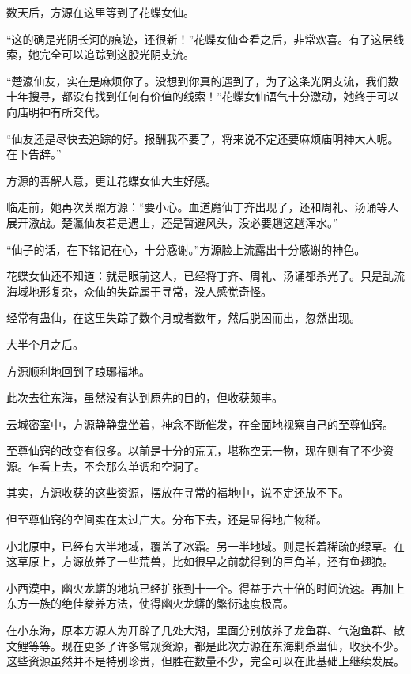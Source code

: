 
\begin{this_body}



数天后，方源在这里等到了花蝶女仙。

“这的确是光阴长河的痕迹，还很新！”花蝶女仙查看之后，非常欢喜。有了这层线索，她完全可以追踪到这股光阴支流。

“楚瀛仙友，实在是麻烦你了。没想到你真的遇到了，为了这条光阴支流，我们数十年搜寻，都没有找到任何有价值的线索！”花蝶女仙语气十分激动，她终于可以向庙明神有所交代。

“仙友还是尽快去追踪的好。报酬我不要了，将来说不定还要麻烦庙明神大人呢。在下告辞。”

方源的善解人意，更让花蝶女仙大生好感。

临走前，她再次关照方源：“要小心。血道魔仙丁齐出现了，还和周礼、汤诵等人展开激战。楚瀛仙友若是遇上，还是暂避风头，没必要趟这趟浑水。”

“仙子的话，在下铭记在心，十分感谢。”方源脸上流露出十分感谢的神色。

花蝶女仙还不知道：就是眼前这人，已经将丁齐、周礼、汤诵都杀光了。只是乱流海域地形复杂，众仙的失踪属于寻常，没人感觉奇怪。

经常有蛊仙，在这里失踪了数个月或者数年，然后脱困而出，忽然出现。

大半个月之后。

方源顺利地回到了琅琊福地。

此次去往东海，虽然没有达到原先的目的，但收获颇丰。

云城密室中，方源静静盘坐着，神念不断催发，在全面地视察自己的至尊仙窍。

至尊仙窍的改变有很多。以前是十分的荒芜，堪称空无一物，现在则有了不少资源。乍看上去，不会那么单调和空洞了。

其实，方源收获的这些资源，摆放在寻常的福地中，说不定还放不下。

但至尊仙窍的空间实在太过广大。分布下去，还是显得地广物稀。

小北原中，已经有大半地域，覆盖了冰霜。另一半地域。则是长着稀疏的绿草。在这草原上，方源放养了一些荒兽，比如很早之前就得到的巨角羊，还有鱼翅狼。

小西漠中，幽火龙蟒的地坑已经扩张到十一个。得益于六十倍的时间流速。再加上东方一族的绝佳豢养方法，使得幽火龙蟒的繁衍速度极高。

在小东海，原本方源人为开辟了几处大湖，里面分别放养了龙鱼群、气泡鱼群、散文鲤等等。现在更多了许多常规资源，都是此次方源在东海剿杀蛊仙，收获不少。这些资源虽然并不是特别珍贵，但胜在数量不少，完全可以在此基础上继续发展。


\end{this_body}
